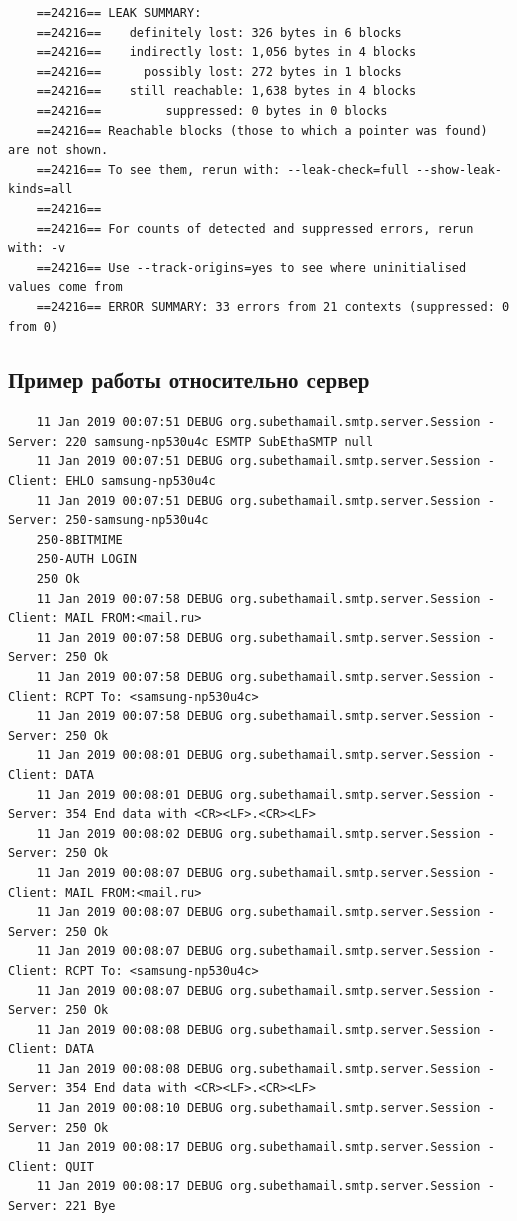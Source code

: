 \documentclass[a4paper,12pt]{report}
\begin{document}
\begin{verbatim}
    ==24216== LEAK SUMMARY:
    ==24216==    definitely lost: 326 bytes in 6 blocks
    ==24216==    indirectly lost: 1,056 bytes in 4 blocks
    ==24216==      possibly lost: 272 bytes in 1 blocks
    ==24216==    still reachable: 1,638 bytes in 4 blocks
    ==24216==         suppressed: 0 bytes in 0 blocks
    ==24216== Reachable blocks (those to which a pointer was found) are not shown.
    ==24216== To see them, rerun with: --leak-check=full --show-leak-kinds=all
    ==24216== 
    ==24216== For counts of detected and suppressed errors, rerun with: -v
    ==24216== Use --track-origins=yes to see where uninitialised values come from
    ==24216== ERROR SUMMARY: 33 errors from 21 contexts (suppressed: 0 from 0)
\end{verbatim}

\subsection*{Пример работы относительно сервер}

\begin{verbatim}
    11 Jan 2019 00:07:51 DEBUG org.subethamail.smtp.server.Session - Server: 220 samsung-np530u4c ESMTP SubEthaSMTP null
    11 Jan 2019 00:07:51 DEBUG org.subethamail.smtp.server.Session - Client: EHLO samsung-np530u4c
    11 Jan 2019 00:07:51 DEBUG org.subethamail.smtp.server.Session - Server: 250-samsung-np530u4c
    250-8BITMIME
    250-AUTH LOGIN
    250 Ok
    11 Jan 2019 00:07:58 DEBUG org.subethamail.smtp.server.Session - Client: MAIL FROM:<mail.ru>
    11 Jan 2019 00:07:58 DEBUG org.subethamail.smtp.server.Session - Server: 250 Ok
    11 Jan 2019 00:07:58 DEBUG org.subethamail.smtp.server.Session - Client: RCPT To: <samsung-np530u4c>
    11 Jan 2019 00:07:58 DEBUG org.subethamail.smtp.server.Session - Server: 250 Ok
    11 Jan 2019 00:08:01 DEBUG org.subethamail.smtp.server.Session - Client: DATA
    11 Jan 2019 00:08:01 DEBUG org.subethamail.smtp.server.Session - Server: 354 End data with <CR><LF>.<CR><LF>
    11 Jan 2019 00:08:02 DEBUG org.subethamail.smtp.server.Session - Server: 250 Ok
    11 Jan 2019 00:08:07 DEBUG org.subethamail.smtp.server.Session - Client: MAIL FROM:<mail.ru>
    11 Jan 2019 00:08:07 DEBUG org.subethamail.smtp.server.Session - Server: 250 Ok
    11 Jan 2019 00:08:07 DEBUG org.subethamail.smtp.server.Session - Client: RCPT To: <samsung-np530u4c>
    11 Jan 2019 00:08:07 DEBUG org.subethamail.smtp.server.Session - Server: 250 Ok
    11 Jan 2019 00:08:08 DEBUG org.subethamail.smtp.server.Session - Client: DATA
    11 Jan 2019 00:08:08 DEBUG org.subethamail.smtp.server.Session - Server: 354 End data with <CR><LF>.<CR><LF>
    11 Jan 2019 00:08:10 DEBUG org.subethamail.smtp.server.Session - Server: 250 Ok
    11 Jan 2019 00:08:17 DEBUG org.subethamail.smtp.server.Session - Client: QUIT
    11 Jan 2019 00:08:17 DEBUG org.subethamail.smtp.server.Session - Server: 221 Bye
\end{verbatim}
\end{document}
